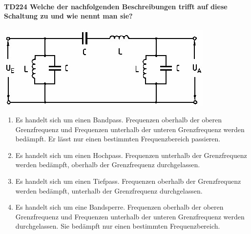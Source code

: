 \documentclass[8pt]{article}
\begin{document}
\begin{enumerate}
\begin{enumerate}[nolistsep,label=\Alph*]
{\paragraph*{TD224 Welche der nachfolgenden Beschreibungen trifft auf diese Schaltung zu und wie nennt man sie?}
\begin{center}
	\begin{minipage}{\linewidth}
		\centering
		\includegraphics[scale=1.0]{pics/td224_a.jpg}
	\end{minipage}
\end{center}
\begin{enumerate}[nolistsep,label=\Alph*]
\item Es handelt sich um einen Bandpass. Frequenzen oberhalb der oberen Grenzfrequenz und Frequenzen unterhalb der unteren Grenzfrequenz werden bedämpft. Er lässt nur einen bestimmten Frequenzbereich passieren.
\item Es handelt sich um einen Hochpass. Frequenzen unterhalb der Grenzfrequenz werden bedämpft, oberhalb der Grenzfrequenz durchgelassen. 
\item Es handelt sich um einen Tiefpass. Frequenzen oberhalb der Grenzfrequenz werden bedämpft, unterhalb der Grenzfrequenz durchgelassen. 
\item Es handelt sich um eine Bandsperre. Frequenzen oberhalb der oberen Grenzfrequenz und Frequenzen unterhalb der unteren Grenzfrequenz werden durchgelassen. Sie bedämpft nur einen bestimmten Frequenzbereich.
\end{enumerate}

}
\end{enumerate}
\end{enumerate}
\end{document}
